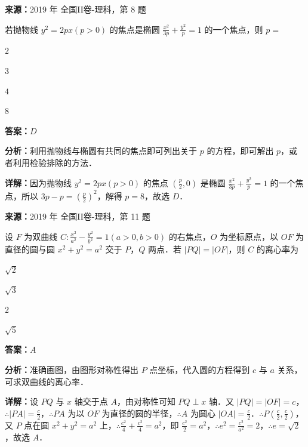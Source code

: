 \begin{question}[points=5]
\textbf{来源：}2019 年 全国II卷-理科，第 8 题\par
若抛物线 $y^2=2px(p>0)$ 的焦点是椭圆 $\frac{x^2}{3p}+\frac{y^2}{p}=1$ 的一个焦点，则 $p=$
\begin{choices}
  \item $2$
  \item $3$
  \item $4$
  \item $8$
\end{choices}
\begin{solution}
\textbf{答案：}$D$

\textbf{分析：}利用抛物线与椭圆有共同的焦点即可列出关于 $p$ 的方程，即可解出 $p$，或者利用检验排除的方法．

\textbf{详解：}因为抛物线 $y^2=2px(p>0)$ 的焦点 $(\frac{p}{2},0)$ 是椭圆 $\frac{x^2}{3p}+\frac{y^2}{p}=1$ 的一个焦点，所以 $3p-p=(\frac{p}{2})^2$，解得 $p=8$，故选 $D$．
\end{solution}
\end{question}

\begin{question}[points=5]
\textbf{来源：}2019 年 全国II卷-理科，第 11 题\par
设 $F$ 为双曲线 $C:\frac{x^2}{a^2}-\frac{y^2}{b^2}=1(a>0,b>0)$ 的右焦点，$O$ 为坐标原点，以 $OF$ 为直径的圆与圆 $x^2+y^2=a^2$ 交于 $P$，$Q$ 两点．若 $|PQ|=|OF|$，则 $C$ 的离心率为
\begin{choices}
  \item $\sqrt{2}$
  \item $\sqrt{3}$
  \item $2$
  \item $\sqrt{5}$
\end{choices}
\begin{solution}
\textbf{答案：}$A$

\textbf{分析：}准确画图，由图形对称性得出 $P$ 点坐标，代入圆的方程得到 $c$ 与 $a$ 关系，可求双曲线的离心率．

\textbf{详解：}设 $PQ$ 与 $x$ 轴交于点 $A$，由对称性可知 $PQ\perp x$ 轴．又 $|PQ|=|OF|=c$，$\therefore |PA|=\frac{c}{2}$，$\therefore PA$ 为以 $OF$ 为直径的圆的半径，$\therefore A$ 为圆心 $|OA|=\frac{c}{2}$．$\therefore P(\frac{c}{2},\frac{c}{2})$，又 $P$ 点在圆 $x^2+y^2=a^2$ 上，$\therefore \frac{c^2}{4}+\frac{c^2}{4}=a^2$，即 $\frac{c^2}{2}=a^2$，$\therefore e^2=\frac{c^2}{a^2}=2$，$\therefore e=\sqrt{2}$，故选 $A$．
\end{solution}
\end{question}

